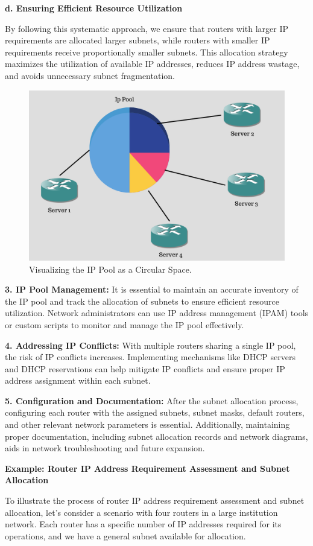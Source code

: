 \textbf{d. Ensuring Efficient Resource Utilization}

By following this systematic approach, we ensure that routers with larger IP requirements are allocated larger subnets, while routers with smaller IP requirements receive proportionally smaller subnets. This allocation strategy maximizes the utilization of available IP addresses, reduces IP address wastage, and avoids unnecessary subnet fragmentation.
\begin{figure}[h]
  \centering
  \includegraphics[width=0.5\linewidth]{Images/Pool.png}
  \caption{Visualizing the IP Pool as a Circular Space.}
\end{figure}

\textbf{3. IP Pool Management:} It is essential to maintain an accurate inventory of the IP pool and track the allocation of subnets to ensure efficient resource utilization. Network administrators can use IP address management (IPAM) tools or custom scripts to monitor and manage the IP pool effectively.

\textbf{4. Addressing IP Conflicts:} With multiple routers sharing a single IP pool, the risk of IP conflicts increases. Implementing mechanisms like DHCP servers and DHCP reservations can help mitigate IP conflicts and ensure proper IP address assignment within each subnet.

\textbf{5. Configuration and Documentation:} After the subnet allocation process, configuring each router with the assigned subnets, subnet masks, default routers, and other relevant network parameters is essential. Additionally, maintaining proper documentation, including subnet allocation records and network diagrams, aids in network troubleshooting and future expansion.



\textbf{Example: Router IP Address Requirement Assessment and Subnet Allocation}

To illustrate the process of router IP address requirement assessment and subnet allocation, let's consider a scenario with four routers in a large institution network. Each router has a specific number of IP addresses required for its operations, and we have a general subnet available for allocation.

